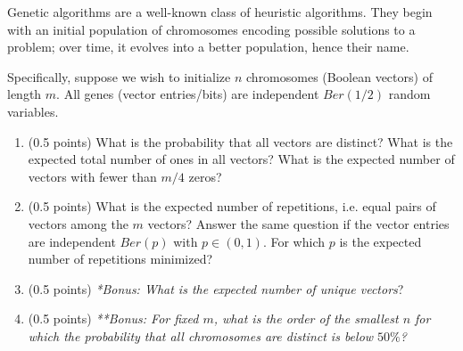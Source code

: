 \documentclass[a4paper]{report}
\begin{document}
\begin{problem}
    Genetic algorithms are a well-known class of heuristic algorithms.
    They begin with an initial
    population of chromosomes encoding possible
    solutions to a problem; over time, it
    evolves into a better population,
    hence their name.

    Specifically, suppose
    we wish to initialize
    $n$ chromosomes (Boolean vectors) of length
    $m$. All genes (vector entries/bits) are independent
    $Ber(1/2)$ random variables.

    \begin{enumerate}
        \item (0.5 points)
        What is the probability
        that all vectors are distinct? What is the expected
        total number of ones in
        all vectors?
        What is the expected number of
        vectors with fewer than $m/4$ zeros?
        \item (0.5 points)
        What is the expected number
        of repetitions, i.e.
        equal pairs of vectors among
        the $m$ vectors?
        Answer the same question
        if the vector entries are
        independent $Ber(p)$ with $p\in(0,1)$. For which $p$ is the expected
        number of repetitions minimized?

        \item (0.5 points) \textit{*Bonus: What is the expected
        number of unique vectors}?

        \item (0.5 points) \textit{**Bonus: For fixed $m$, what is the order of the smallest $n$
        for which the probability that all
        chromosomes are distinct is below $50\%$?}
\end{enumerate}

\end{problem}
\end{document}
